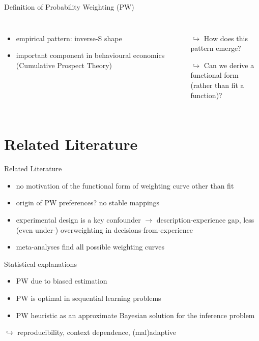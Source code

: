 \begin{frame}{Definition of Probability Weighting (PW)}
\begin{columns}
\begin{itemize}
  \item empirical pattern: inverse-S shape
  \item important component in behavioural economics (Cumulative Prospect Theory)
\end{itemize}
\vspace{1em}
\bi
	\item	{}
\ei
\vspace{1em}
	\begin{itemize}
	  \item[$\hookrightarrow$] How does this pattern emerge?
  	\item[$\hookrightarrow$] Can we derive a functional form\\ 
	(rather than fit a function)?
	\end{itemize}

\end{columns}
\end{frame}

\section[Literature]{Related Literature}
\begin{frame}{Related Literature}
\begin{itemize}
  \item no motivation of the functional form of weighting curve other than fit
  \item origin of PW preferences? no stable mappings \parencite{StewartETAL2015} 
  \item experimental design is a key confounder $\rightarrow$ description-experience gap, \ie less (even under-) overweighting in decisions-from-experience \parencite{HertwigETAL2004,HertwigErev2009}
  \item meta-analyses find all possible weighting curves \parencites[][Tab. 9]{UngemachETAL2009,WulffETAL2018} 
\end{itemize}
\vspace{1em}
Statistical explanations
\begin{itemize}
  \item PW due to biased estimation \parencite{FoxHadar2006}
  \item PW is optimal in sequential learning problems \parencite{SeoETAL2019}
	\item PW heuristic as an approximate Bayesian solution for the inference problem \parencite{Martins2006}
\end{itemize}  
\bc $\hookrightarrow$ reproducibility, context dependence, (mal)adaptive \ec 
\end{frame}

